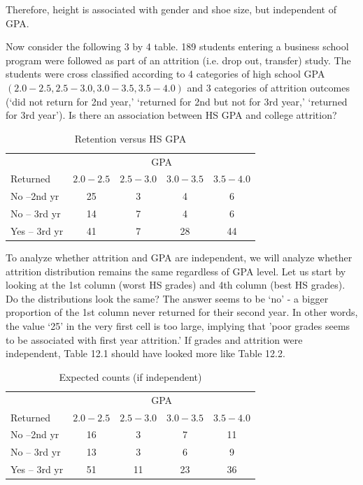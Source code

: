\documentclass[11pt, chapterprefix=true]{scrbook}\usepackage[]{graphicx}\usepackage[]{color}
\begin{document}

Therefore, height is associated with gender and shoe size, but independent of GPA.  

Now consider the following 3 by 4 table.  189 students entering a business school program were followed as part of an attrition (i.e. drop out, transfer) study.  The students were cross classified according to 4 categories of high school GPA $(2.0-2.5, 2.5-3.0, 3.0-3.5, 3.5-4.0)$ and 3 categories of attrition outcomes (`did not return for 2nd year,' `returned for 2nd but not for 3rd year,' `returned for 3rd year').  Is there an association between HS GPA and college attrition?

\begin{table}[ht]
\centering
\caption{Retention versus HS GPA}
\begin{tabular}{@{} lcccc @{}} \hline
& \multicolumn{4}{c}{GPA} \\
Returned & $2.0-2.5$ & $2.5-3.0$ & $3.0-3.5$ & $3.5-4.0$ \\ \hline
No --2nd yr & 25 & 3 & 4 & 6 \\
No -- 3rd yr & 14 & 7 & 4 & 6 \\
Yes -- 3rd yr & 41 & 7 & 28 & 44 \\ \hline
\end{tabular}
\end{table}

To analyze whether attrition and GPA are independent, we will analyze whether 
attrition distribution remains the same regardless of GPA level.  Let us start by looking at the 1st column (worst HS grades) and 4th column (best HS grades).  Do the distributions look the same?   The answer seems to be `no' - a bigger proportion of the 1st column never returned for their second year.  In other words, the value `25' in the very first cell is too large, implying that 'poor grades seems to be associated with first year attrition.'  If grades and attrition were independent, Table 12.1 should have looked more like Table 12.2.

\begin{table}[ht]
\centering
\caption{Expected counts (if independent)}
\begin{tabular}{@{} lcccc @{}} \hline
& \multicolumn{4}{c}{GPA} \\
Returned & $2.0-2.5$ & $2.5-3.0$ & $3.0-3.5$ & $3.5-4.0$ \\ \hline
No --2nd yr & 16 & 3 & 7 & 11 \\
No -- 3rd yr & 13 & 3 & 6 & 9 \\
Yes -- 3rd yr & 51 & 11 & 23 & 36 \\ \hline
\end{tabular}
\end{table}
\end{document}
